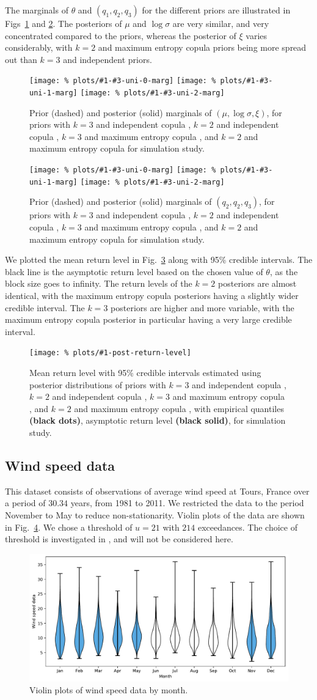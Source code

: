 \documentclass{article}
\newcommand{\marginals}[6]{
	\begin{figure}
		\centering
		\texttt{[image: \%
						plots/\#1-\#3-uni-0-marg]}
		\texttt{[image: \%
						plots/\#1-\#3-uni-1-marg]}
		\texttt{[image: \%
						plots/\#1-\#3-uni-2-marg]}
		\caption{Prior (dashed) and posterior (solid) marginals of
			$(#4, #5, #6)$, for priors with
			$k = 3$ and independent copula \textbf{\color{blue}{(blue)}},
			$k = 2$ and independent copula \textbf{\color{green}{(green)}},
			$k = 3$ and maximum entropy copula
			\textbf{\color{orange}{(orange)}}, and
			$k = 2$ and maximum entropy copula \textbf{\color{red}{(red)}}
			for #2.}
		\label{table:#1-#3-uni-marg}
	\end{figure}
}
\newcommand{\allmarginals}[2]{
	\marginals{#1}{#2}{theta}{\mu}{\log\sigma}{\xi}
	\marginals{#1}{#2}{q}{q_2}{q_2}{q_3}
}
\newcommand{\allreturnlevels}[3]{
	\begin{figure}
		\centering
		\texttt{[image: \%
			plots/\#1-post-return-level]}
		\caption{Mean return level with 95\% credible intervals
			estimated using posterior distributions of priors with
			$k = 3$ and independent copula \textbf{\color{blue}{(blue)}},
			$k = 2$ and independent copula \textbf{\color{green}{(green)}},
			$k = 3$ and maximum entropy copula
			\textbf{\color{orange}{(orange)}}, and
			$k = 2$ and maximum entropy copula \textbf{\color{red}{(red)}},
			with empirical quantiles {\color{black} \textbf{(black dots)}},
			#3for #2.}
		\label{table:#1-post-return-level}
	\end{figure}
}
\begin{document}
%
The marginals of
$\theta$ and $(q_1, q_2, q_3)$ for the different priors are illustrated
in Figs~\ref{table:ppp-theta-uni-marg} and
\ref{table:ppp-q-uni-marg}.
The posteriors of $\mu$ and $\log\sigma$ are very similar,
and very concentrated compared to the priors, whereas the
posterior of $\xi$ varies considerably,
with $k = 2$ and maximum entropy copula priors being more spread out
than $k = 3$ and independent priors.
%
\allmarginals{ppp}{simulation study}
%

%
We plotted the mean return level in Fig.~\ref{table:ppp-post-return-level}
along with 95\% credible intervals.
The black line is the asymptotic return level based on the
chosen value of $\theta$, as the block size goes to infinity.
The return levels of the $k = 2$ posteriors are almost identical,
with the maximum entropy copula posteriors
having a slightly wider credible interval.
The $k = 3$ posteriors are higher and more variable,
with the maximum entropy copula posterior
in particular having a very large credible interval.
%
\allreturnlevels{ppp}{simulation study}{%
asymptotic return level {\color{black} \textbf{(black solid)}}, }
%
\FloatBarrier
\subsection{Wind speed data}
%

%
This dataset consists of observations of average wind speed
at Tours, France over a period of $30.34$ years, from 1981 to 2011.
We restricted the data to the period November to May
to reduce non-stationarity.
Violin plots of the data are shown in Fig.~\ref{fig:ws-violinplot}.
We chose a threshold of $u = 21$ with $214$ exceedances.
The choice of threshold is investigated in \cite{coles2001},
and will not be considered here.
%
\begin{figure}
	\centering
	\includegraphics[width=1\linewidth]{plots/ws-boxplot.pdf}
	\caption{Violin plots of wind speed data by month.}
	\label{fig:ws-violinplot}
\end{figure}
%
\end{document}
